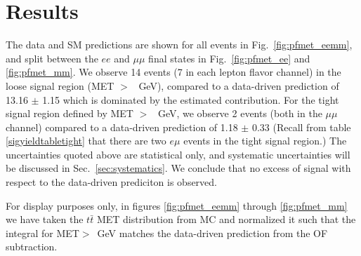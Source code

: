 
\section{Results}
\label{sec:results}

The data and SM predictions are shown for all events in 
Fig.~\ref{fig:pfmet_eemm}, 
and split between the $ee$
and $\mu\mu$ final states in 
Fig.~\ref{fig:pfmet_ee} and \ref{fig:pfmet_mm}. 
We observe 14 events (7 in each lepton flavor channel) 
in the loose signal region (MET $>$ \signalmetl~GeV), 
compared to a data-driven prediction of 
13.16  $\pm$  1.15
which is dominated by the estimated \ttbar contribution. 
For the tight signal region defined by MET $>$ \signalmett~GeV, 
we observe 2 events (both in the $\mu\mu$ channel) compared to a 
data-driven prediction of 
1.18  $\pm$  0.33
(Recall from table \ref{sigyieldtabletight} that there are two $e\mu$ events in 
the tight signal region.)
The uncertainties quoted above are statistical only, and systematic uncertainties will be 
discussed in Sec.~\ref{sec:systematics}. We conclude that no excess of signal 
with respect to the data-driven prediciton is observed.

For display purposes only, in figures \ref{fig:pfmet_eemm} through \ref{fig:pfmet_mm} we have 
taken the
$t\bar{t}$ MET distribution from MC and normalized it such that the integral for 
MET$>$\signalmetl~GeV matches the data-driven prediction
from the OF subtraction. 




